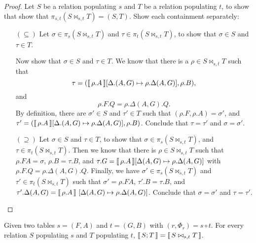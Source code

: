 \begin{proof}
  Let $S$ be a relation populating $s$ and $T$ be a relation
  populating $t$, to show that show that
  $ \pi_{s,t}(S \bowtie_{s,t}T) = (S,T)$. Show each containment
  separately:
  \begin{enumerate}[align=left]
  \item[$(\subseteq)$] Let $\sigma \in \pi_s(S \bowtie_{s,t} T)$ and
    $\tau \in \pi_t(S \bowtie_{s,t} T)$, to show that $\sigma \in S$
    and $\tau \in T$.

    Now show that $\sigma \in S$ and $\tau \in T$. We know that there is a $\rho \in S \bowtie_{s,t} T$ such that
    \[\tau = (\llbracket\,\rho.A\,\rrbracket[\Delta.(A,G) \mapsto \rho.\Delta(A,G)],
      \rho.B),\] and \[\rho.F.Q = \rho.\Delta(A,G).Q.\] By definition,
    there are $\sigma' \in S$ and $\tau' \in T$ such that
    $(\rho.F,\rho.A) = \sigma'$, and
    $\tau' = (\llbracket\,\rho.A\,\rrbracket[\Delta.(A,G) \mapsto \rho.\Delta(A,G)],
    \rho.B)$. Conclude that $\tau = \tau'$ and $\sigma =
    \sigma'$. \hfill \checkmark

  \item[$(\supseteq)$] Let $\sigma \in S$ and $\tau \in T$, to show
    that $\sigma \in \pi_s(S \bowtie_{s,t}T)$, and
    $\tau \in \pi_t(S \bowtie_{s,t} T)$.  Then we know that there is
    $\rho \in S\bowtie_{s,t}T$ such that $\rho.FA = \sigma$,
    $\rho.B = \tau.B$, and
    $\tau.G = \llbracket\,\rho.A\,\rrbracket[\Delta(A,G) \mapsto \rho.\Delta(A,G)]$
    with $\rho.F.Q = \rho.\Delta(A,G).Q$.  Finally, we have
    $\sigma' \in \pi_s(S \bowtie_{s,t}T)$ and
    $\tau' \in \pi_t(S \bowtie_{s,t} T)$ such that
    $\sigma' = \rho.FA$, $\tau'.B = \tau.B$, and
    $\tau'.\Delta(A,G) = \llbracket\,\rho.A\,\rrbracket~[\Delta(A,G) \mapsto
    \rho.\Delta(A,G)]$. Conclude that $\sigma = \sigma'$ and
    $\tau = \tau'$. \hfill \checkmark
  \end{enumerate}
\end{proof}

\begin{theorem}
  \label{thm:comp-func-equiv}
  Given two tables $s = (F,A)$ and $t = (G,B)$ with
  $(r, \Phi_r) = s \circ t$. For every relation $S$ populating $s$ and
  $T$ populating $t$, $\llbracket\,S;T\,\rrbracket = \llbracket\,S\bowtie_{s,t}T\,\rrbracket$.
\end{theorem}


